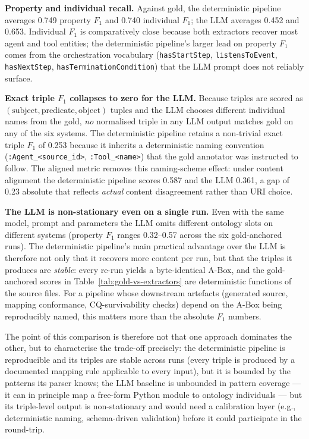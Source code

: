 \textbf{Property and individual recall.} Against gold, the
deterministic pipeline averages 0.749 property $F_1$ and 0.740
individual $F_1$; the LLM averages 0.452 and 0.653. Individual $F_1$
is comparatively close because both extractors recover most agent and
tool entities; the deterministic pipeline's larger lead on property
$F_1$ comes from the orchestration vocabulary
(\texttt{hasStartStep}, \texttt{listensToEvent},
\texttt{hasNextStep}, \texttt{hasTerminationCondition}) that the LLM
prompt does not reliably surface.

\textbf{Exact triple $F_1$ collapses to zero for the LLM.} Because
triples are scored as $(\text{subject},\text{predicate},\text{object})$
tuples and the LLM chooses different individual names from the gold,
\emph{no} normalised triple in any LLM output matches gold on any of
the six systems. The deterministic pipeline retains a non-trivial
exact triple $F_1$ of 0.253 because it inherits a deterministic naming
convention (\texttt{:Agent\_<source\_id>}, \texttt{:Tool\_<name>}) that
the gold annotator was instructed to follow. The aligned metric
removes this naming-scheme effect: under content alignment the
deterministic pipeline scores 0.587 and the LLM 0.361, a gap of 0.23
absolute that reflects \emph{actual} content disagreement rather than
URI choice.

\textbf{The LLM is non-stationary even on a single run.} Even with the
same model, prompt and parameters the LLM omits different ontology
slots on different systems (property $F_1$ ranges 0.32--0.57 across
the six gold-anchored runs). The deterministic pipeline's main
practical advantage over the LLM is therefore not only that it
recovers more content per run, but that the triples it produces are
\emph{stable}: every re-run yields a byte-identical A-Box, and the
gold-anchored scores in Table~\ref{tab:gold-vs-extractors} are
deterministic functions of the source files. For a pipeline whose
downstream artefacts (generated source, mapping conformance,
CQ-survivability checks) depend on the A-Box being reproducibly
named, this matters more than the absolute $F_1$ numbers.

The point of this comparison is therefore not that one approach
dominates the other, but to characterise the trade-off precisely:
the deterministic pipeline is reproducible and its triples are stable
across runs (every triple is produced by a documented mapping rule
applicable to every input), but it is bounded by the patterns its
parser knows; the LLM baseline is unbounded in pattern coverage — it
can in principle map a free-form Python module to ontology
individuals — but its triple-level output is non-stationary and would
need a calibration layer (e.g., deterministic naming, schema-driven
validation) before it could participate in the round-trip.


